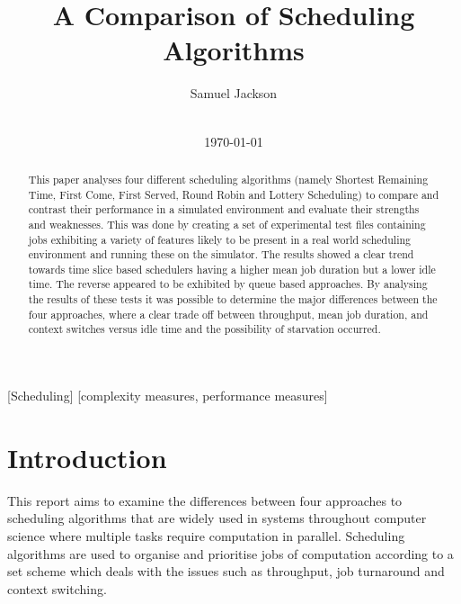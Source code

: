 \documentclass{acm_proc_article-sp}
\begin{document}
\title{A Comparison of Scheduling Algorithms}
\author{
\alignauthor
Samuel Jackson\\
       \\
}
\date{\today}

\maketitle

\begin{abstract}
This paper analyses four different scheduling algorithms (namely Shortest Remaining Time, First Come, First Served, Round Robin and Lottery Scheduling) to compare and contrast their performance in a simulated environment and evaluate their strengths and weaknesses. This was done by creating a set of experimental test files containing jobs exhibiting a variety of features likely to be present in a real world scheduling environment and running these on the simulator. The results showed a clear trend towards time slice based schedulers having a higher mean job duration but a lower idle time. The reverse appeared to be exhibited by queue based approaches. By analysing the results of these tests it was possible to determine the major differences between the four approaches, where a clear trade off between throughput, mean job duration, and context switches versus idle time and the possibility of starvation occurred.

\end{abstract}

[Scheduling]
[complexity measures, performance measures]



\section{Introduction}
This report aims to examine the differences between four approaches to scheduling algorithms that are widely used in systems throughout computer science where multiple tasks require computation in parallel. Scheduling algorithms are used to organise and prioritise jobs of computation according to a set scheme which deals with the issues such as throughput, job turnaround and context switching.
\end{document}
